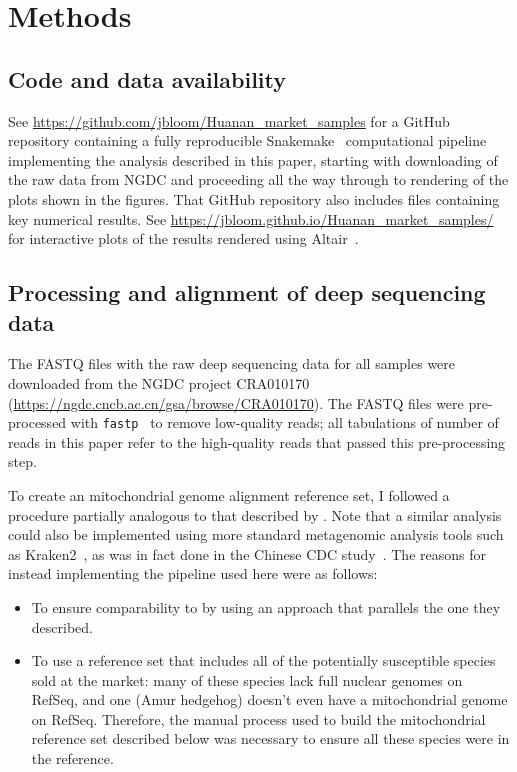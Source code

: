 \documentclass[9pt,twocolumn,twoside]{gsajnl_modified}
\begin{document}
{\small

\section{Methods}
\subsection{Code and data availability}
See \url{https://github.com/jbloom/Huanan_market_samples} for a GitHub repository containing a fully reproducible Snakemake~\citep{molder2021sustainable} computational pipeline implementing the analysis described in this paper, starting with downloading of the raw data from NGDC and proceeding all the way through to rendering of the plots shown in the figures.
That GitHub repository also includes files containing key numerical results.
See \url{https://jbloom.github.io/Huanan_market_samples/} for interactive plots of the results rendered using Altair~\citep{vanderplas2018altair}.

\subsection{Processing and alignment of deep sequencing data}
The FASTQ files with the raw deep sequencing data for all samples were downloaded from the NGDC project CRA010170 (\url{https://ngdc.cncb.ac.cn/gsa/browse/CRA010170}).
The FASTQ files were pre-processed with \texttt{fastp}~\citep{chen2018fastp} to remove low-quality reads; all tabulations of number of reads in this paper refer to the high-quality reads that passed this pre-processing step.

To create an mitochondrial genome alignment reference set, I followed a procedure partially analogous to that described by \citet{crits2023genetic}.
Note that a similar analysis could also be implemented using more standard metagenomic analysis tools such as Kraken2~\citep{wood2019improved}, as was in fact done in the Chinese CDC study~\citep{liu2023surveillance}.
The reasons for instead implementing the pipeline used here were as follows:
\begin{itemize}
\item To ensure comparability to \citet{crits2023genetic} by using an approach that parallels the one they described.
\item To use a reference set that includes all of the potentially susceptible species sold at the market: many of these species lack full nuclear genomes on RefSeq, and one (Amur hedgehog) doesn't even have a mitochondrial genome on RefSeq. Therefore, the manual process used to build the mitochondrial reference set described below was necessary to ensure all these species were in the reference.
\end{itemize}

}
\end{document}
